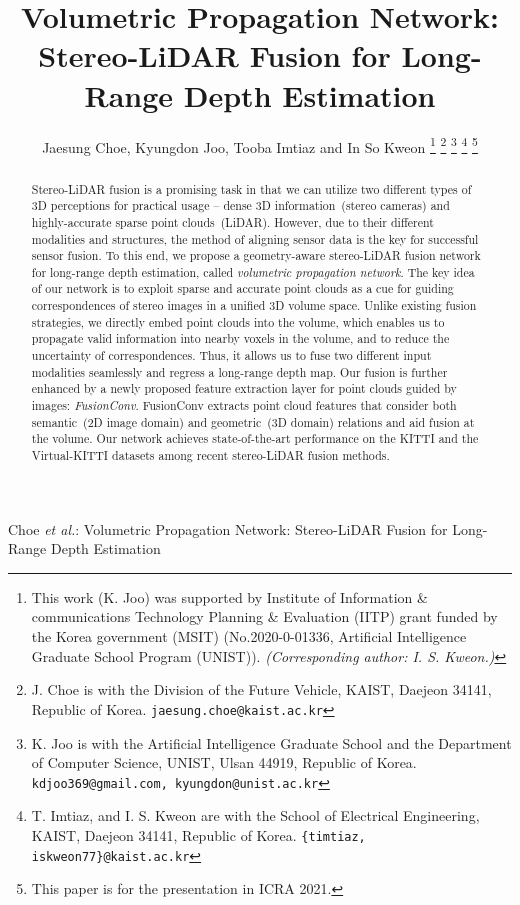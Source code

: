 \documentclass[letterpaper, 10 pt, conference]{ieeeconf}
\begin{document}
\title{\LARGE \bf
Volumetric Propagation Network: \\ Stereo-LiDAR Fusion for Long-Range Depth Estimation
}

\author{Jaesung Choe, Kyungdon Joo, Tooba Imtiaz and In So Kweon
\thanks{This work (K. Joo) was supported by Institute of Information \& communications Technology Planning \& Evaluation (IITP) grant funded by the Korea government (MSIT) (No.2020-0-01336, Artificial Intelligence Graduate School Program (UNIST)). \textit{(Corresponding author: I. S. Kweon.)}
}
\thanks{J. Choe is with the Division of the Future Vehicle, KAIST, Daejeon 34141, Republic of Korea.
{\tt jaesung.choe@kaist.ac.kr}}
\thanks{K. Joo is with the Artificial Intelligence Graduate School and the Department of Computer Science, UNIST, Ulsan 44919, Republic of Korea.
{\tt kdjoo369@gmail.com, kyungdon@unist.ac.kr}}
\thanks{T. Imtiaz, and I. S. Kweon are with the School of Electrical Engineering, KAIST, Daejeon 34141, Republic of Korea.
{\tt \{timtiaz, iskweon77\}@kaist.ac.kr}}
\thanks{This paper is for the presentation in ICRA 2021.}
}




{Choe \MakeLowercase{\textit{et al.}}: Volumetric Propagation Network: Stereo-LiDAR Fusion for Long-Range Depth Estimation}

\maketitle





\begin{abstract}
Stereo-LiDAR fusion is a promising task in that we can utilize two different types of 3D perceptions for practical usage -- dense 3D information~(stereo cameras) and highly-accurate sparse point clouds~(LiDAR). However, due to their different modalities and structures, the method of aligning sensor data is the key for successful sensor fusion.
To this end, we propose a geometry-aware stereo-LiDAR fusion network for long-range depth estimation, called \emph{volumetric propagation network}. The key idea of our network is to exploit sparse and accurate point clouds as a cue for guiding correspondences of stereo images in a unified 3D volume space. Unlike existing fusion strategies, we directly embed point clouds into the volume, which enables us to propagate valid information into nearby voxels in the volume, and to reduce the uncertainty of correspondences. Thus, it allows us to fuse two different input modalities seamlessly and regress a long-range depth map. Our fusion is further enhanced by a newly proposed feature extraction layer for point clouds guided by images: \emph{FusionConv}. FusionConv extracts point cloud features that consider both semantic~(2D image domain) and geometric~(3D domain) relations and aid fusion at the volume. Our network achieves state-of-the-art performance on the KITTI and the Virtual-KITTI datasets among recent stereo-LiDAR fusion methods. 
\end{abstract}
\end{document}
